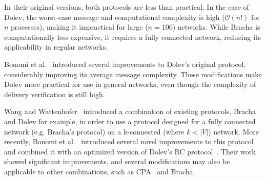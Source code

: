 In their original versions, both protocols are less than practical. In the case of Dolev, the worst-case message and computational complexity is high ($\mathcal{O}(n!)$ for $n$ processes), making it impractical for large ($n=100$) networks. While Bracha is computationally less expensive, it requires a fully connected network, reducing its applicability in regular networks.

Bonomi et al.~\cite{bonomi2019multihop} introduced several improvements to Dolev's original protocol, considerably improving its average message complexity. These modifications make Dolev more practical for use in general networks, even though the complexity of delivery verification is still high. 

Wang and Wattenhofer~\cite{bracha-dolev} introduced a combination of existing protocols, 
Bracha and Dolev for example, in order to use a protocol designed for a fully connected network (e.g. Bracha's protocol) on a k-connected (where $k < |V|$) network. More recently, Bonomi et al.~\cite{bonomi2021practical} introduced several novel improvements to this protocol and combined it with an optimized version of Dolev's RC protocol~\cite{bonomi2019multihop,dolev-improvement}. 
Their work showed significant improvements, and several modifications may also be applicable to other combinations, such as CPA~\cite{cpa} and Bracha.

